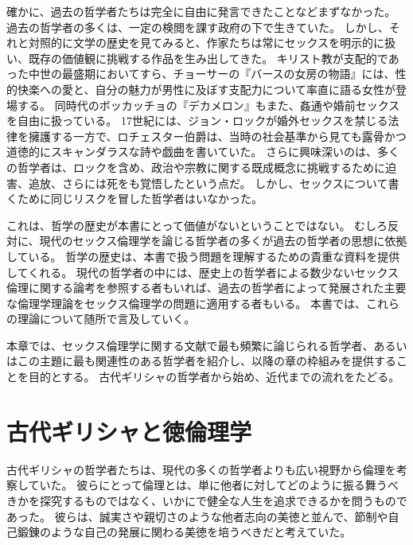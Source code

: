 \documentclass[paper=a4,book,openany]{jlreq}
\newcommand{\ig}[1]{}           %
\begin{document}
確かに、過去の哲学者たちは完全に自由に発言できたことなどまずなかった。
過去の哲学者の多くは、一定の検閲を課す政府の下で生きていた。
しかし、それと対照的に文学の歴史を見てみると、作家たちは常にセックスを明示的に扱い、既存の価値観に挑戦する作品を生み出してきた。
キリスト教が支配的であった中世の最盛期においてすら、チョーサーの『バースの女房の物語』には、性的快楽への愛と、自分の魅力が男性に及ぼす支配力について率直に語る女性が登場する。
同時代のボッカッチョの『デカメロン』もまた、姦通や婚前セックスを自由に扱っている。
17世紀には、ジョン・ロックが婚外セックスを禁じる法律を擁護する一方で、ロチェスター伯爵\ig{\footnote{2nd Earl of Rochester, 1647-1680、イングランドの貴族、宮廷詩人。
}}は、当時の社会基準から見ても露骨かつ道徳的にスキャンダラスな詩や戯曲を書いていた。
さらに興味深いのは、多くの哲学者は、ロックを含め、政治や宗教に関する既成概念に挑戦するために迫害、追放、さらには死をも覚悟したという点だ。
しかし、セックスについて書くために同じリスクを冒した哲学者はいなかった。

これは、哲学の歴史が本書にとって価値がないということではない。
むしろ反対に、現代のセックス倫理学を論じる哲学者の多くが過去の哲学者の思想に依拠している。
哲学の歴史は、本書で扱う問題を理解するための貴重な資料を提供してくれる。
現代の哲学者の中には、歴史上の哲学者による数少ないセックス倫理に関する論考を参照する者もいれば、過去の哲学者によって発展された主要な倫理学理論をセックス倫理学の問題に適用する者もいる。
本書では、これらの理論について随所で言及していく。

本章では、セックス倫理学に関する文献で最も頻繁に論じられる哲学者、あるいはこの主題に最も関連性のある哲学者を紹介し、以降の章の枠組みを提供することを目的とする。
古代ギリシャの哲学者から始め、近代までの流れをたどる。

\section{古代ギリシャと徳倫理学}

古代ギリシャの哲学者たちは、現代の多くの哲学者よりも広い視野から倫理を考察していた。
彼らにとって倫理とは、単に他者に対してどのように振る舞うべきかを探究するものではなく、いかにで健全な人生を追求できるかを問うものであった。
彼らは、誠実さや親切さのような他者志向の美徳と並んで、節制や自己鍛錬のような自己の発展に関わる美徳を培うべきだと考えていた。
\end{document}
